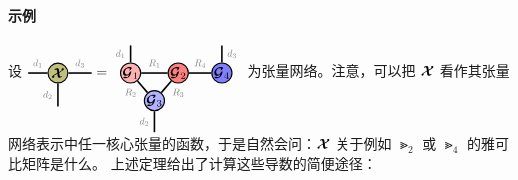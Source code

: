 \paragraph{示例}
设 
$\begin{tikzpicture}[baseline=\baseline]
    \tikzset{tensor/.style = {minimum size = 0.5cm,shape = circle,thick,draw=black,inner sep = 0pt}, edge/.style = {thick,line width=.4mm},every loop/.style={}}
    \def\x{0}
    \def\y{0}
     \node[tensor,fill=green!50!red!50!white] (B) at (\x+1,\y) {$\Xt$};
    \draw[edge] (B) -- (\x+0.25,0) node [midway,above] {\scalebox{0.7}{\dimcolor{$d_1$}}};
    \draw[edge] (B) -- (\x+1.85,\y) node [midway,above] {\scalebox{0.7}{\dimcolor{$d_3$}}};
    \draw[edge] (B) -- (\x+1,\y-0.85) node [midway,left] {\scalebox{0.7}{\dimcolor{$d_2$}}};
\end{tikzpicture}
=
\begin{tikzpicture}[baseline=\baseline]
    \tikzset{tensor/.style = {minimum size = 0.5cm,shape = circle,thick,draw=black,inner sep = 0pt}, edge/.style = {thick,line width=.4mm},every loop/.style={}}
    \def\x{0}
    \def\y{0}
    \node[tensor,fill=red!30!white] (A) at (\x+2,\y) {$\Gt_1$};
    \node[tensor,fill=red!50!white] (B) at (\x+3.2,\y) {$\Gt_2$};
    \node[tensor,fill=blue!30!white] (C) at (\x+2.6,\y-0.7) {$\Gt_3$};
    \node[tensor,fill=blue!50!white] (D) at (\x+4.3,\y) {$\Gt_4$};
    \draw[edge] (A) -- (B) node [midway,above] {\scalebox{0.7}{\dimcolor{$R_1$}}};
    \draw[edge] (A) -- (C);
    \node[draw=none] () at (\x+2,\y-0.5) {\scalebox{0.7}{\dimcolor{$R_2$}}};
    \draw[edge] (B) -- (C);
    \node[draw=none] () at (\x+3.2,\y-0.5) {\scalebox{0.7}{\dimcolor{$R_3$}}};
    \draw[edge] (B) -- (D) node [midway,above] {\scalebox{0.7}{\dimcolor{$R_4$}}};
    \draw[edge] (A) -- (\x+2,\y+0.7) node [midway,left] {\scalebox{0.7}{\dimcolor{$d_1$}}};
    \draw[edge] (D) -- (\x+4.3,\y+0.7) node [midway,right] {\scalebox{0.7}{\dimcolor{$d_3$}}};
    \draw[edge] (C) -- (\x+2.6,\y-1.5) node [midway,left] {\scalebox{0.7}{\dimcolor{$d_2$}}};
\end{tikzpicture}
$ 为张量网络。注意，可以把 $\bm{\mathcal{X}}$ 看作其张量网络表示中任一核心张量的函数，于是自然会问：$\bm{\mathcal{X}}$ 关于例如 $\Gt_2$ 或 $\Gt_4$ 的雅可比矩阵是什么。
上述定理给出了计算这些导数的简便途径：
